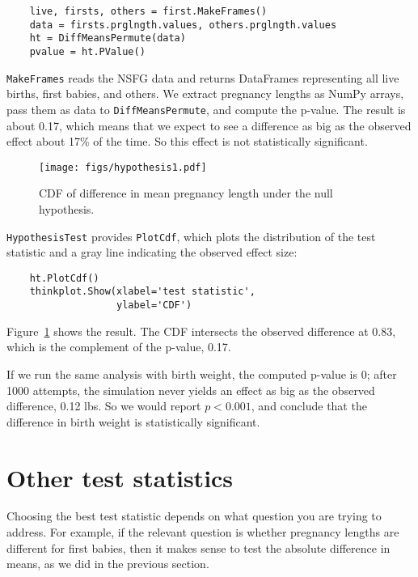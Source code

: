 \begin{verbatim}
    live, firsts, others = first.MakeFrames()
    data = firsts.prglngth.values, others.prglngth.values
    ht = DiffMeansPermute(data)
    pvalue = ht.PValue()
\end{verbatim}

{\tt MakeFrames} reads the NSFG data and returns DataFrames
representing all live births, first babies, and others.
We extract pregnancy lengths as NumPy arrays, pass them as
data to {\tt DiffMeansPermute}, and compute the p-value.  The
result is about 0.17, which means that we expect to see a difference
as big as the observed effect about 17\% of the time.  So
this effect is not statistically significant.
   

\begin{figure}
\centerline{\texttt{[image: figs/hypothesis1.pdf]}}
\caption{CDF of difference in mean pregnancy length under the null
hypothesis.}
\label{hypothesis1}
\end{figure}

{\tt HypothesisTest} provides {\tt PlotCdf}, which plots the
distribution of the test statistic and a gray line indicating
the observed effect size:

\begin{verbatim}
    ht.PlotCdf()
    thinkplot.Show(xlabel='test statistic',
                   ylabel='CDF')
\end{verbatim}

Figure~\ref{hypothesis1} shows the result.  The CDF intersects the
observed difference at 0.83, which is the complement of the p-value,
0.17.

If we run the same analysis with birth weight, the computed p-value
is 0; after 1000 attempts,
the simulation never yields an effect
as big as the observed difference, 0.12 lbs.  So we would
report $p < 0.001$, and
conclude that the difference in birth weight is statistically
significant.
   


\section{Other test statistics}

Choosing the best test statistic depends on what question you are
trying to address.  For example, if the relevant question is whether
pregnancy lengths are different for first
babies, then it makes sense to test the absolute difference in means,
as we did in the previous section.

